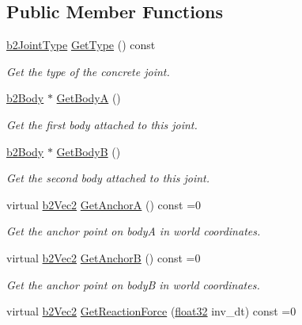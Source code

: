 \subsection*{Public Member Functions}
\begin{DoxyCompactItemize}
\item 
\mbox{\hyperlink{b2_joint_8h_a0bb202d8a286c888a11985b07b2272ab}{b2\+Joint\+Type}} \mbox{\hyperlink{classb2_joint_ac56eef62fe1ac7c9e5e21a79fb035255}{Get\+Type}} () const
\begin{DoxyCompactList}\small\item\em Get the type of the concrete joint. \end{DoxyCompactList}\item 
\mbox{\hyperlink{classb2_body}{b2\+Body}} $\ast$ \mbox{\hyperlink{classb2_joint_a2ed5eca3dbdce48665c14452b280613f}{Get\+BodyA}} ()
\begin{DoxyCompactList}\small\item\em Get the first body attached to this joint. \end{DoxyCompactList}\item 
\mbox{\hyperlink{classb2_body}{b2\+Body}} $\ast$ \mbox{\hyperlink{classb2_joint_a700b3d4c87f34f456151b9598e4641a0}{Get\+BodyB}} ()
\begin{DoxyCompactList}\small\item\em Get the second body attached to this joint. \end{DoxyCompactList}\item 
virtual \mbox{\hyperlink{structb2_vec2}{b2\+Vec2}} \mbox{\hyperlink{classb2_joint_abe46ca3aad5db73909a9b5a7b2117447}{Get\+AnchorA}} () const =0
\begin{DoxyCompactList}\small\item\em Get the anchor point on bodyA in world coordinates. \end{DoxyCompactList}\item 
virtual \mbox{\hyperlink{structb2_vec2}{b2\+Vec2}} \mbox{\hyperlink{classb2_joint_a88e947c65d4ea26fe539f02a8cb7f7a9}{Get\+AnchorB}} () const =0
\begin{DoxyCompactList}\small\item\em Get the anchor point on bodyB in world coordinates. \end{DoxyCompactList}\item 
virtual \mbox{\hyperlink{structb2_vec2}{b2\+Vec2}} \mbox{\hyperlink{classb2_joint_a7e0eddefb9b69ad050b8ef6425838a74}{Get\+Reaction\+Force}} (\mbox{\hyperlink{b2_settings_8h_aacdc525d6f7bddb3ae95d5c311bd06a1}{float32}} inv\+\_\+dt) const =0

\end{DoxyCompactItemize}

